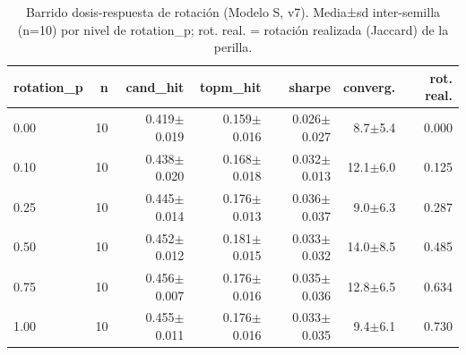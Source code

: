\begin{table}[H]
\centering
\small
\caption{Barrido dosis-respuesta de rotación (Modelo S, v7). Media±sd inter-semilla (n=10) por nivel de rotation\_p; rot. real. = rotación realizada (Jaccard) de la perilla.}
\label{tab:tabla_dosis_respuesta}
\begin{tabular}{lrrrrrr}
\toprule
rotation\_p & n & cand\_hit & topm\_hit & sharpe & converg. & rot. real. \\
\midrule
0.00 & 10 & 0.419$\pm$0.019 & 0.159$\pm$0.016 & 0.026$\pm$0.027 & 8.7$\pm$5.4 & 0.000 \\
0.10 & 10 & 0.438$\pm$0.020 & 0.168$\pm$0.018 & 0.032$\pm$0.013 & 12.1$\pm$6.0 & 0.125 \\
0.25 & 10 & 0.445$\pm$0.014 & 0.176$\pm$0.013 & 0.036$\pm$0.037 & 9.0$\pm$6.3 & 0.287 \\
0.50 & 10 & 0.452$\pm$0.012 & 0.181$\pm$0.015 & 0.033$\pm$0.032 & 14.0$\pm$8.5 & 0.485 \\
0.75 & 10 & 0.456$\pm$0.007 & 0.176$\pm$0.016 & 0.035$\pm$0.036 & 12.8$\pm$6.5 & 0.634 \\
1.00 & 10 & 0.455$\pm$0.011 & 0.176$\pm$0.016 & 0.033$\pm$0.035 & 9.4$\pm$6.1 & 0.730 \\
\bottomrule
\end{tabular}
\end{table}
